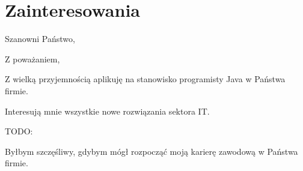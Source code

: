 \documentclass[12pt,a4paper,sans]{moderncv}
\begin{document}
\section{Zainteresowania}

\clearpage
\thispagestyle{empty}

\date{\today} %
\opening{Szanowni Państwo,} %
\closing{Z poważaniem,} %

\makelettertitle %

Z wielką przyjemnością aplikuję na stanowisko programisty Java w Państwa firmie.

Interesują mnie wszystkie nowe rozwiązania sektora IT.

TODO: 

Byłbym szczęśliwy, gdybym mógł rozpocząć moją karierę zawodową w Państwa firmie.

\makeletterclosing %
\end{document}
